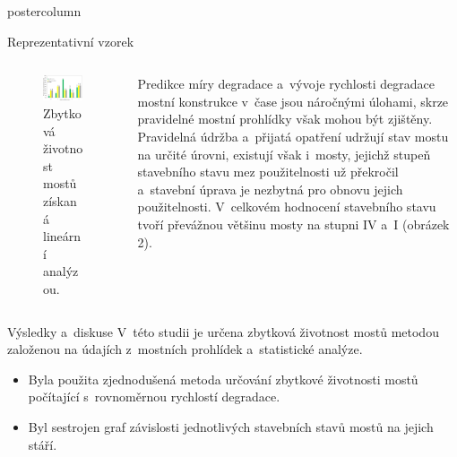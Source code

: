 \documentclass{beamer}
\begin{document}
\begin{frame}
\begin{columns}
\begin{column}{.60\textwidth}
\begin{beamercolorbox}[center]{postercolumn}
\begin{minipage}{.98\textwidth}
{\begin{myblock}{Reprezentativní vzorek}
\begin{minipage}{1\textwidth}
\begin{columns}
\begin{column}{0.72\textwidth}
\begin{figure}
\begin{minipage}{0.9\textwidth}
											\centering\includegraphics[width=1\textwidth]{img/2}
											\caption{Zbytková životnost mostů získaná lineární analýzou.}
											\label{fig:fail2}
										\end{minipage}
									\end{figure}
								\end{column}
								\begin{column}{0.28\textwidth}
									\begin{minipage}{0.9\textwidth}
										Predikce míry degradace a~vývoje rychlosti degradace mostní konstrukce v~čase jsou náročnými úlohami, skrze pravidelné mostní prohlídky však mohou být zjištěny. Pravidelná údržba a~přijatá opatření udržují stav mostu na určité úrovni, existují však i~mosty, jejichž stupeň stavebního stavu mez použitelnosti už překročil a~stavební úprava je nezbytná pro obnovu jejich použitelnosti. V~celkovém hodnocení stavebního stavu tvoří převážnou většinu mosty na stupni IV a~I (obrázek 2).
									\end{minipage}
								\end{column}
							\end{columns}
						\end{minipage}
					\end{myblock}\vfill
					\begin{myblock}{Výsledky a~diskuse}
						V~této studii je určena zbytková životnost mostů metodou založenou na údajích z~mostních prohlídek a~statistické analýze.
						\vskip 1cm
						\begin{itemize}
							\item Byla použita zjednodušená metoda určování zbytkové životnosti mostů počítající s~rovnoměrnou rychlostí degradace.
							\item Byl sestrojen graf závislosti jednotlivých stavebních stavů mostů na jejich stáří.

\end{itemize}
\end{myblock}}
\end{minipage}
\end{beamercolorbox}
\end{column}
\end{columns}
\end{frame}
\end{document}
